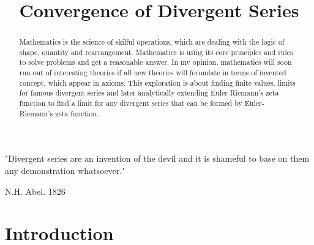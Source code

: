 \documentclass[a4paper]{article}
\title{Convergence of Divergent Series}
\date{}
\author{}
\begin{document}
\maketitle
\tableofcontents
\listoffigures
\listoftables
\newpage

 \begin{center}
 "Divergent series are an invention of the devil and it is shameful
to base on them any demonstration whatsoever."\cite{Abel}
 \end{center}
 \begin{flushright}
   N.H. Abel. 1826
   \end{flushright}


\begin{abstract}
    Mathematics is the science of skilful operations, which are dealing with the logic of shape, quantity
and rearrangement. Mathematics is using its core principles and rules to solve problems and get a
reasonable answer. In my opinion, mathematics will soon run out of interesting theories if all new
theories will formulate in terms of invented concept, which appear in axioms. This exploration is
about finding finite values, limits for famous divergent series and later analytically extending
Euler-Riemann's zeta function to find a limit for any divergent series that can be formed by Euler-
Riemann's zeta function.
\end{abstract}

\section{Introduction}
\end{document}
